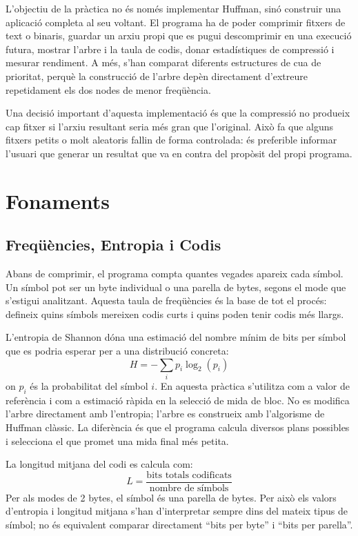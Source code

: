 \documentclass[conference,compsoc]{IEEEtran}
\begin{document}
L'objectiu de la pràctica no és només implementar Huffman, sinó construir
una aplicació completa al seu voltant. El programa ha de poder comprimir
fitxers de text o binaris, guardar un arxiu propi que es pugui
descomprimir en una execució futura, mostrar l'arbre i la taula de codis,
donar estadístiques de compressió i mesurar rendiment. A més, s'han
comparat diferents estructures de cua de prioritat, perquè la construcció
de l'arbre depèn directament d'extreure repetidament els dos nodes de
menor freqüència.

Una decisió important d'aquesta implementació és que la compressió no
produeix cap fitxer si l'arxiu resultant seria més gran que l'original.
Això fa que alguns fitxers petits o molt aleatoris fallin de forma
controlada: és preferible informar l'usuari que generar un resultat que
va en contra del propòsit del propi programa.

\section{Fonaments}

\subsection{Freqüències, Entropia i Codis}

Abans de comprimir, el programa compta quantes vegades apareix cada
símbol. Un símbol pot ser un byte individual o una parella de bytes,
segons el mode que s'estigui analitzant. Aquesta taula de freqüències és
la base de tot el procés: defineix quins símbols mereixen codis curts i
quins poden tenir codis més llargs.

L'entropia de Shannon dóna una estimació del nombre mínim de bits per
símbol que es podria esperar per a una distribució concreta:
\[
H = -\sum_i p_i \log_2(p_i)
\]
on $p_i$ és la probabilitat del símbol $i$. En aquesta pràctica s'utilitza
com a valor de referència i com a estimació ràpida en la selecció de mida
de bloc. No es modifica l'arbre directament amb l'entropia; l'arbre es
construeix amb l'algorisme de Huffman clàssic. La diferència és que el
programa calcula diversos plans possibles i selecciona el que promet una
mida final més petita.

La longitud mitjana del codi es calcula com:
\[
L = \frac{\text{bits totals codificats}}{\text{nombre de símbols}}
\]
Per als modes de 2 bytes, el símbol és una parella de bytes. Per això
els valors d'entropia i longitud mitjana s'han d'interpretar sempre dins
del mateix tipus de símbol; no és equivalent comparar directament
``bits per byte'' i ``bits per parella''.
\end{document}
